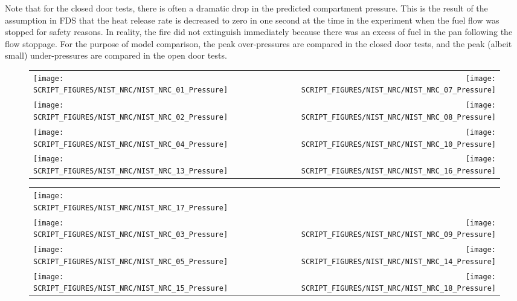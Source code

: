 Note that for the closed door tests, there is often a dramatic drop in the predicted compartment pressure. This is the result of the assumption in FDS that the heat release rate is decreased to zero in one second at the time in the experiment when the fuel flow was stopped for safety reasons.  In reality, the fire did not extinguish immediately because there was an excess of fuel in the pan following the flow stoppage. For the purpose of model comparison, the peak over-pressures are compared in the closed door tests, and the peak (albeit small) under-pressures are compared in the open door tests.

\newpage

\begin{figure}[p]
\begin{tabular*}{\textwidth}{l@{\extracolsep{\fill}}r}
\texttt{[image: SCRIPT\_FIGURES/NIST\_NRC/NIST\_NRC\_01\_Pressure]} &
\texttt{[image: SCRIPT\_FIGURES/NIST\_NRC/NIST\_NRC\_07\_Pressure]} \\
\texttt{[image: SCRIPT\_FIGURES/NIST\_NRC/NIST\_NRC\_02\_Pressure]} &
\texttt{[image: SCRIPT\_FIGURES/NIST\_NRC/NIST\_NRC\_08\_Pressure]} \\
\texttt{[image: SCRIPT\_FIGURES/NIST\_NRC/NIST\_NRC\_04\_Pressure]} &
\texttt{[image: SCRIPT\_FIGURES/NIST\_NRC/NIST\_NRC\_10\_Pressure]} \\
\texttt{[image: SCRIPT\_FIGURES/NIST\_NRC/NIST\_NRC\_13\_Pressure]} &
\texttt{[image: SCRIPT\_FIGURES/NIST\_NRC/NIST\_NRC\_16\_Pressure]}
\end{tabular*}
\label{NIST_NRC_Pressure_Closed}
\end{figure}

\begin{figure}[p]
\begin{tabular*}{\textwidth}{l@{\extracolsep{\fill}}r}
\texttt{[image: SCRIPT\_FIGURES/NIST\_NRC/NIST\_NRC\_17\_Pressure]} &
   \\
\texttt{[image: SCRIPT\_FIGURES/NIST\_NRC/NIST\_NRC\_03\_Pressure]} &
\texttt{[image: SCRIPT\_FIGURES/NIST\_NRC/NIST\_NRC\_09\_Pressure]} \\
\texttt{[image: SCRIPT\_FIGURES/NIST\_NRC/NIST\_NRC\_05\_Pressure]} &
\texttt{[image: SCRIPT\_FIGURES/NIST\_NRC/NIST\_NRC\_14\_Pressure]} \\
\texttt{[image: SCRIPT\_FIGURES/NIST\_NRC/NIST\_NRC\_15\_Pressure]} &
\texttt{[image: SCRIPT\_FIGURES/NIST\_NRC/NIST\_NRC\_18\_Pressure]}
\end{tabular*}
\label{NIST_NRC_Pressure_Open}
\end{figure}

